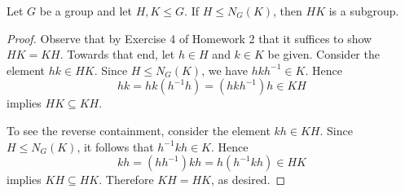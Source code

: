 \documentclass[10pt]{amsart}
\begin{document}
\begin{lem}\label{normalizer}
  Let $G$ be a group and let $H,K \leq G$.
  If $H \leq N_G(K)$, then $HK$ is a subgroup.
  
  \begin{proof}
    Observe that by Exercise 4 of Homework 2 that it suffices to show $HK = KH$.
    Towards that end, let $h \in H$ and $k \in K$ be given.
    Consider the element $hk \in HK$.
    Since $H \leq N_G(K)$, we have $hkh^{-1} \in K$.
    Hence $$hk = hk(h^{-1}h) = (hkh^{-1})h \in KH$$ implies $HK \subseteq KH$.
    
    To see the reverse containment, consider the element $kh \in KH$.
    Since $H \leq N_G(K)$, it follows that $h^{-1}kh \in K$.
    Hence $$kh = (hh^{-1})kh = h(h^{-1}kh) \in HK$$ implies $KH \subseteq HK$.
    Therefore $KH = HK$, as desired.
   \end{proof}
 \end{lem}
\end{document}
